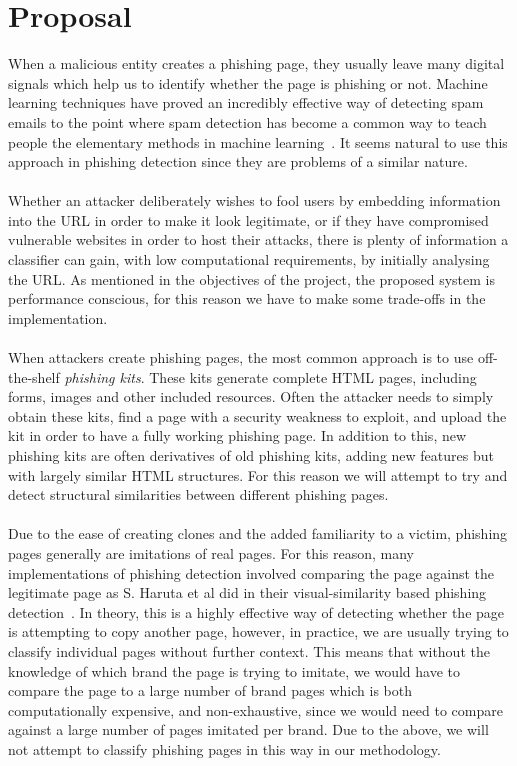 \documentclass[12pt,twoside]{report}
\begin{document}
\chapter{Proposal}
When a malicious entity creates a phishing page, they usually leave many digital signals which help us to identify whether the page is phishing or not. Machine learning techniques have proved an incredibly effective way of detecting spam emails to the point where spam detection has become a common way to teach people the elementary methods in machine learning~\cite{spamclassifier}. It seems natural to use this approach in phishing detection since they are problems of a similar nature.
\\\\
Whether an attacker deliberately wishes to fool users by embedding information into the URL in order to make it look legitimate, or if they have compromised vulnerable websites in order to host their attacks, there is plenty of information a classifier can gain, with low computational requirements, by initially analysing the URL. As mentioned in the objectives of the project, the proposed system is performance conscious, for this reason we have to make some trade-offs in the implementation.
\\\\
When attackers create phishing pages, the most common approach is to use off-the-shelf \textit{phishing kits}. These kits generate complete HTML pages, including forms, images and other included resources. Often the attacker needs to simply obtain these kits, find a page with a security weakness to exploit, and upload the kit in order to have a fully working phishing page. In addition to this, new phishing kits are often derivatives of old phishing kits, adding new features but with largely similar HTML structures. For this reason we will attempt to try and detect structural similarities between different phishing pages.
\\\\
Due to the ease of creating clones and the added familiarity to a victim, phishing pages generally are imitations of real pages. For this reason, many implementations of phishing detection involved comparing the page against the legitimate page as S. Haruta et al did in their visual-similarity based phishing detection~\cite{visualsimilarity}. In theory, this is a highly effective way of detecting whether the page is attempting to copy another page, however, in practice, we are usually trying to classify individual pages without further context. This means that without the knowledge of which brand the page is trying to imitate, we would have to compare the page to a large number of brand pages which is both computationally expensive, and non-exhaustive, since we would need to compare against a large number of pages imitated per brand. Due to the above, we will not attempt to classify phishing pages in this way in our methodology.
\end{document}
